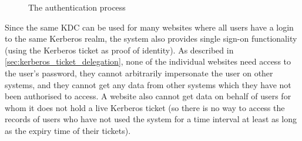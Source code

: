 \documentclass[12pt]{report}
\begin{document}
\begin{figure}[ht]
  \begin{center}
  \end{center}
  \caption{The authentication process}
  \label{fig:authentication_process}
\end{figure}

Since the same KDC can be used for many websites where all users have a login to the same Kerberos realm, the system also provides single sign-on functionality (using the Kerberos ticket as proof of identity). As described in \autoref{sec:kerberos_ticket_delegation}, none of the individual websites need access to the user's password, they cannot arbitrarily impersonate the user on other systems, and they cannot get any data from other systems which they have not been authorised to access. A website also cannot get data on behalf of users for whom it does not hold a live Kerberos ticket (so there is no way to access the records of users who have not used the system for a time interval at least as long as the expiry time of their tickets).
\end{document}
